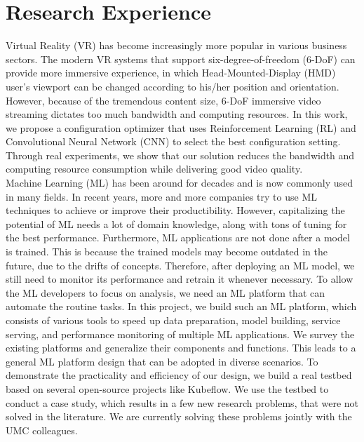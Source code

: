 \section{Research Experience}
{Virtual Reality (VR) has become increasingly more popular in various business sectors. 
The modern VR systems that support
six-degree-of-freedom (6-DoF) can provide more immersive experience, in which Head-Mounted-Display (HMD) user’s viewport can be changed
according to his/her position and orientation. However, because of the tremendous content size, 6-DoF immersive
video streaming dictates too much bandwidth and computing resources. In this work, we propose a configuration
optimizer that uses Reinforcement Learning (RL) and Convolutional Neural Network (CNN) to 
select the best configuration setting. Through real experiments, we show that our solution reduces the bandwidth and computing resource consumption while delivering
good video quality.
} \\
{
Machine Learning (ML) has been around for decades
and is now commonly used in many fields. 
In recent years, more and more companies try to use ML techniques to achieve or improve their
productibility. However, capitalizing the potential of ML needs a lot of domain knowledge, along with tons of tuning for the best performance.
Furthermore, ML applications are not done after a model is trained. This is because the trained models may become outdated in the future, due to the drifts of concepts. 
Therefore, after deploying an ML model, we still need to monitor its performance and retrain it whenever necessary.
To allow the ML developers to focus on analysis, we need an ML platform that can automate the routine tasks.
In this project, we build such an ML platform, which consists of various tools to speed up data preparation, model building, service serving, and performance monitoring of multiple ML applications.
We survey the existing platforms and generalize their components and functions.
This leads to a general ML platform design that can be adopted in diverse scenarios.
To demonstrate the practicality and efficiency of our design, we build a real testbed based on several open-source projects like Kubeflow.
We use the testbed to conduct a case study, which results in a few new research problems, that were not solved in the literature. We are currently solving these problems jointly with the UMC colleagues. 
}\\
